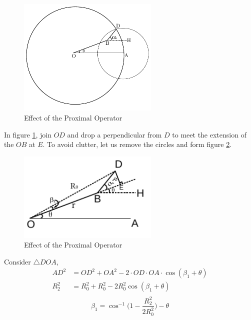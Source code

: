 \begin{figure}[h]
\centering \vspace{-0.1in}
\includegraphics[width=0.6\textwidth]{images/geo3.pdf}
\vspace{-20pt} \caption[Effect of the proximal Operator]{\small Effect of the Proximal Operator }
\label{fig:alpha1}
\end{figure} 
\newpage
In figure \ref{fig:alpha1}, join $OD$ and drop
a perpendicular from $D$ to meet the extension of the $OB$ at $E$. To avoid clutter, let us 
remove the circles and form figure \ref{fig:alpha11}. 
\begin{figure}[h]
\centering \vspace{-0.1in}
\includegraphics[width=0.6\textwidth]{images/geo4.pdf}
\vspace{-20pt} \caption[Effect of the proximal Operator]{\small Effect of the Proximal Operator }
\label{fig:alpha11}
\end{figure}
Consider $\bigtriangleup DOA$, 
\begin{align*}
	AD^2 &= OD^2 + OA^2 - 2 \cdot OD \cdot OA \cdot \cos(\beta_1+\theta) \\
	R_2^2 &= R_0^2 + R_0^2 - 2R_0^2\cos(\beta_1 + \theta)\\
\end{align*}
\begin{equation}\label{eq:beta1}
	\beta_1 = \cos^{-1}\bigg(1-\frac{R_2^2}{2R_0^2}\bigg) - \theta
\end{equation}
